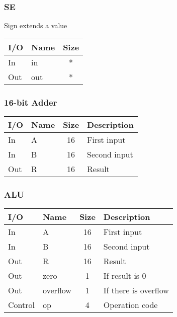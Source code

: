 \documentclass{article}
\begin{document}
		\subsubsection{SE}
			\begin{center} Sign extends a value \end{center}
			\begin{center} \begin{tabular}{| l | l | c |} \hline 
				I/O & Name & Size \\ \hline 
				In  & in   & * \\ \hline
				Out & out  & * \\ \hline
			\end{tabular} \end{center}
		\subsubsection{16-bit Adder}
			\begin{center} \begin{tabular}{| l | l | c | l |} \hline 
				I/O & Name     & Size & Description \\ \hline 
				In  & A        & 16   & First input \\ \hline
				In  & B        & 16   & Second input \\ \hline
				Out & R        & 16   & Result \\ \hline
			\end{tabular} \end{center}
		\subsubsection{ALU}
			\begin{center} \begin{tabular}{| l | l | c | l |} \hline 
				I/O & Name     & Size & Description \\ \hline 
				In  & A        & 16   & First input \\ \hline
				In  & B        & 16   & Second input \\ \hline
				Out & R        & 16   & Result \\ \hline
				Out & zero     & 1    & If result is 0 \\ \hline
				Out & overflow & 1    & If there is overflow \\ \hline
				Control & op   & 4    & Operation code \\ \hline
			\end{tabular} \end{center}
\end{document}
